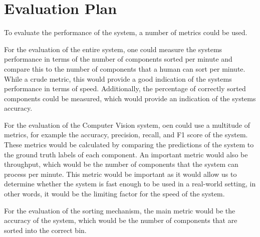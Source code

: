 \section{Evaluation Plan}
To evaluate the performance of the system, a number of metrics could be used.

For the evaluation of the entire system, one could measure the systems performance in terms of the number of components sorted per minute and compare
this to the number of components that a human can sort per minute. While a crude metric, this would provide a good indication of the systems performance
in terms of speed. Additionally, the percentage of correctly sorted components could be measured, which would provide an indication of the systems
accuracy.

For the evaluation of the Computer Vision system, oen could use a multitude of metrics, for example the accuracy, precision, recall, and F1 score of the
system. These metrics would be calculated by comparing the predictions of the system to the ground truth labels of each component. An important
metric would also be throughput, which would be the number of components that the system can process per minute. This metric would be important
as it would allow us to determine whether the system is fast enough to be used in a real-world setting, in other words, it would be the limiting factor
for the speed of the system.

For the evaluation of the sorting mechanism, the main metric would be the accuracy of the system, which would be the number of components that are
sorted into the correct bin.
